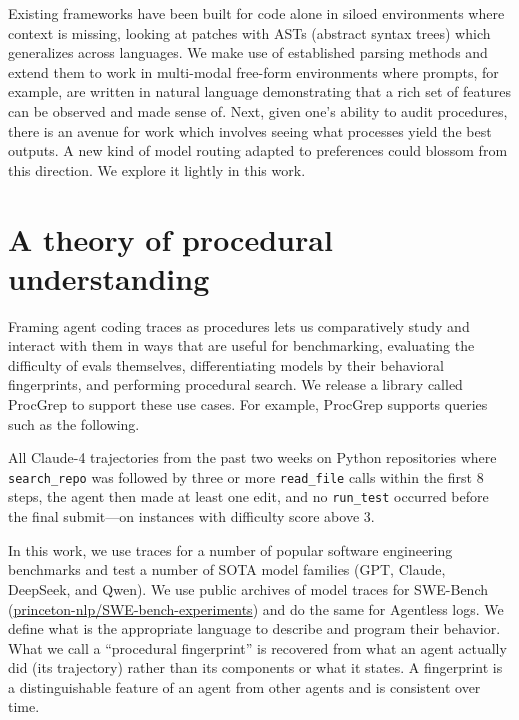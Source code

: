 \documentclass[11pt]{article}
\begin{document}
Existing frameworks have been built for code alone in siloed environments where context is missing, looking at patches \cite{GumTree2014, yin-neubig-2017-syntactic} with ASTs (abstract syntax trees) which generalizes across languages. We make use of established parsing methods and extend them to work in multi-modal free-form environments where prompts, for example, are written in natural language \cite{cruz2026textastherichestpreferencesignal} demonstrating that a rich set of features can be observed and made sense of. Next, given one's ability to audit procedures, there is an avenue for work which involves seeing what processes yield the best outputs. A new kind of model routing adapted to preferences could blossom from this direction. We explore it lightly in this work.

\section{A theory of procedural understanding}
Framing agent coding traces as procedures lets us comparatively study
and interact with them in ways that are useful for benchmarking,
evaluating the difficulty of evals themselves, differentiating models
by their behavioral fingerprints, and performing procedural search. We
release a library called ProcGrep to support these use cases. For
example, ProcGrep supports queries such as the following.

\begin{tcolorbox}[colback=black!3, colframe=black!30, boxrule=0.4pt,
  left=10pt, right=10pt, top=8pt, bottom=8pt, fontupper=\small]
All Claude-4 trajectories from the past two weeks on Python repositories
where \texttt{search\_repo} was followed by three or more
\texttt{read\_file} calls within the first 8 steps, the agent then made
at least one edit, and no \texttt{run\_test} occurred before the final
submit---on instances with difficulty score above 3.
\end{tcolorbox}

In this work, we use traces for a number of popular software engineering benchmarks and test a number of SOTA model families (GPT, Claude, DeepSeek, and Qwen). We use public archives of model traces for SWE-Bench (\url{princeton-nlp/SWE-bench-experiments}) and do the same for Agentless logs. We define what is the appropriate language to describe and program their behavior. What we call a ``procedural fingerprint'' is recovered from what an agent actually did (its trajectory) rather than its components or what it states. A fingerprint is a distinguishable feature of an agent from other agents and is consistent over time.
\end{document}
